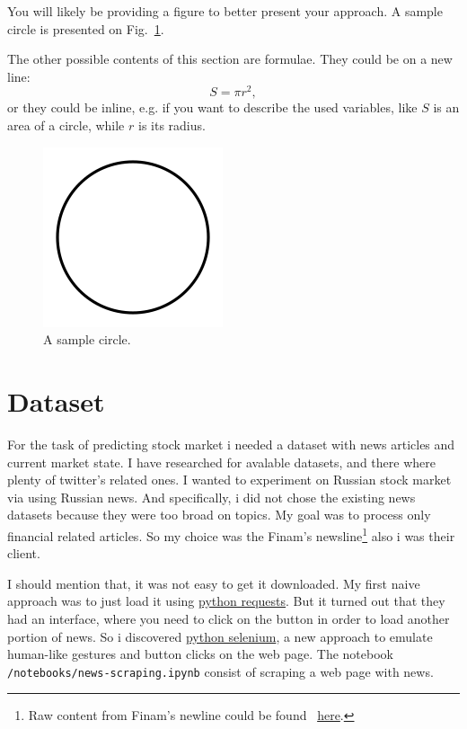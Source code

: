 \documentclass{article}
\begin{document}
You will likely be providing a figure to better present your approach. A sample circle is presented on Fig.~\ref{fig:circle}.

The other possible contents of this section are formulae. They could be on a new line:
$$S=\pi r^2,$$
or they could be inline, e.g. if you want to describe the used variables, like $S$ is an area of a circle, while $r$ is its radius. 

\begin{figure}[!tbh]
    \centering
    \includegraphics[width=0.3\linewidth]{circle.png}
    \caption{A sample circle.}
    \label{fig:circle}
\end{figure}

\section{Dataset}

For the task of predicting stock market i needed a dataset with news articles and current market state.
I have researched for avalable datasets, and there where plenty of twitter's related ones.
I wanted to experiment on Russian stock market via using Russian news. 
And specifically, i did not chose the existing news datasets because they were too broad on topics. My goal was to process only financial related articles.
So my choice was the Finam's newsline\footnote{Raw content from Finam's newline could be found ~\href{https://www.finam.ru/publications/selection/united/}{here}.} also i was their client.

I should mention that, it was not easy to get it downloaded. 
My first naive approach was to just load it using \href{https://pypi.org/project/requests/}{python requests}. But it turned out that they had an interface, where you need to click on the button in order to load another portion of news. So i discovered \href{https://pypi.org/project/selenium/}{python selenium}, a new approach to emulate human-like gestures and button clicks on the web page.
The notebook \texttt{/notebooks/news-scraping.ipynb} consist of scraping a web page with news.
\end{document}
